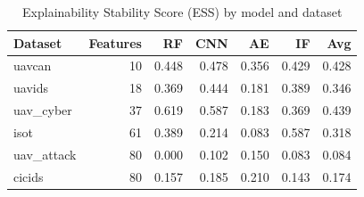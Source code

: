 \begin{table}
\caption{Explainability Stability Score (ESS) by model and dataset}
\label{tab:ess}
\begin{tabular}{lrrrrrr}
\toprule
Dataset & Features & RF & CNN & AE & IF & Avg \\
\midrule
uavcan & 10 & 0.448 & 0.478 & 0.356 & 0.429 & 0.428 \\
uavids & 18 & 0.369 & 0.444 & 0.181 & 0.389 & 0.346 \\
uav_cyber & 37 & 0.619 & 0.587 & 0.183 & 0.369 & 0.439 \\
isot & 61 & 0.389 & 0.214 & 0.083 & 0.587 & 0.318 \\
uav_attack & 80 & 0.000 & 0.102 & 0.150 & 0.083 & 0.084 \\
cicids & 80 & 0.157 & 0.185 & 0.210 & 0.143 & 0.174 \\
\bottomrule
\end{tabular}
\end{table}

